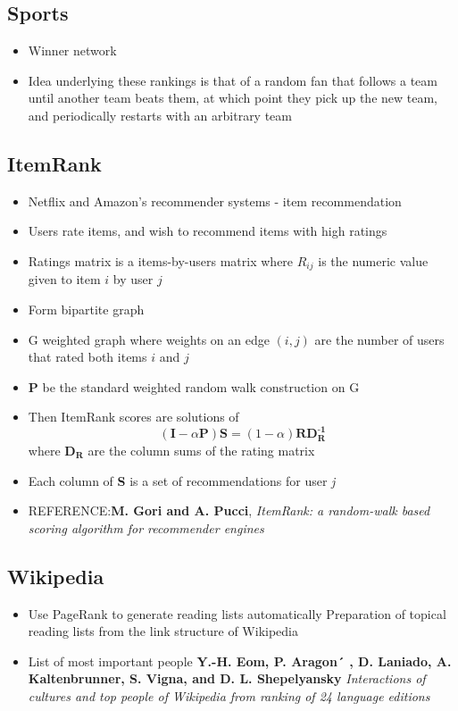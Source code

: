 \documentclass[11pt]{report}
\begin{document}
\subsection{Sports}
\begin{itemize}
\item Winner network
\item Idea underlying these rankings is that of a random fan that follows a team until another team beats them, at which point they pick up the new team, and periodically restarts with an arbitrary team
\end{itemize}
\subsection{ItemRank}
\begin{itemize}
\item Netflix and Amazon's recommender systems - item recommendation
\item Users rate items, and wish to recommend items with high ratings
\item Ratings matrix is a items-by-users matrix where $R_{ij}$ is the numeric value given to item $i$ by user $j$
\item Form bipartite graph
\item G weighted graph where weights on an edge $(i,j)$ are the number of users that rated both items $i$ and $j$
\item \textbf{P} be the standard weighted random walk construction on G
\item Then ItemRank scores are solutions of \begin{equation}
(\textbf{I} -\alpha\textbf{P}) \textbf{S}= (1-\alpha)\textbf{RD}_\textbf{R}^{\textbf{-1}}
\end{equation} 
where $\textbf{D}_\textbf{R}$ are the column sums of the rating matrix
\item Each column of \textbf{S} is a set of recommendations for user \textit{j}
\item REFERENCE:\textbf{M. Gori and A. Pucci}, \textit{ItemRank: a random-walk based scoring algorithm for recommender engines}
\end{itemize}
\subsection{Wikipedia}
\begin{itemize}
\item Use PageRank to generate reading lists automatically Preparation of topical reading lists from the link structure of Wikipedia
\item List of most important people \textbf{Y.-H. Eom, P. Aragon´ , D. Laniado, A. Kaltenbrunner, S. Vigna, and D. L. Shepelyansky} \textit{Interactions of cultures and top people of Wikipedia from ranking of 24 language editions}
\end{itemize}
\end{document}
